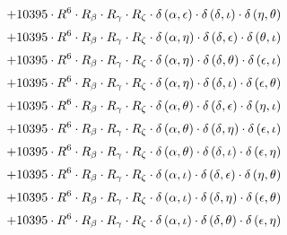 \begin{subequations}
\begin{gather}
 \\[0.2em] \notag 		 + 10395 \cdot R^{6} \cdot R_{\beta{}} \cdot R_{\gamma{}} \cdot R_{\zeta{}} \cdot \delta{}\left(\alpha{}, \epsilon{}\right) \cdot \delta{}\left(\delta{}, \iota{}\right) \cdot \delta{}\left(\eta{}, \theta{}\right) 
 \\[0.2em] \notag 		 + 10395 \cdot R^{6} \cdot R_{\beta{}} \cdot R_{\gamma{}} \cdot R_{\zeta{}} \cdot \delta{}\left(\alpha{}, \eta{}\right) \cdot \delta{}\left(\delta{}, \epsilon{}\right) \cdot \delta{}\left(\theta{}, \iota{}\right) 
 \\[0.2em] \notag 		 + 10395 \cdot R^{6} \cdot R_{\beta{}} \cdot R_{\gamma{}} \cdot R_{\zeta{}} \cdot \delta{}\left(\alpha{}, \eta{}\right) \cdot \delta{}\left(\delta{}, \theta{}\right) \cdot \delta{}\left(\epsilon{}, \iota{}\right) 
 \\[0.2em] \notag 		 + 10395 \cdot R^{6} \cdot R_{\beta{}} \cdot R_{\gamma{}} \cdot R_{\zeta{}} \cdot \delta{}\left(\alpha{}, \eta{}\right) \cdot \delta{}\left(\delta{}, \iota{}\right) \cdot \delta{}\left(\epsilon{}, \theta{}\right) 
 \\[0.2em] \notag 		 + 10395 \cdot R^{6} \cdot R_{\beta{}} \cdot R_{\gamma{}} \cdot R_{\zeta{}} \cdot \delta{}\left(\alpha{}, \theta{}\right) \cdot \delta{}\left(\delta{}, \epsilon{}\right) \cdot \delta{}\left(\eta{}, \iota{}\right) 
 \\[0.2em] \notag 		 + 10395 \cdot R^{6} \cdot R_{\beta{}} \cdot R_{\gamma{}} \cdot R_{\zeta{}} \cdot \delta{}\left(\alpha{}, \theta{}\right) \cdot \delta{}\left(\delta{}, \eta{}\right) \cdot \delta{}\left(\epsilon{}, \iota{}\right) 
 \\[0.2em] \notag 		 + 10395 \cdot R^{6} \cdot R_{\beta{}} \cdot R_{\gamma{}} \cdot R_{\zeta{}} \cdot \delta{}\left(\alpha{}, \theta{}\right) \cdot \delta{}\left(\delta{}, \iota{}\right) \cdot \delta{}\left(\epsilon{}, \eta{}\right) 
 \\[0.2em] \notag 		 + 10395 \cdot R^{6} \cdot R_{\beta{}} \cdot R_{\gamma{}} \cdot R_{\zeta{}} \cdot \delta{}\left(\alpha{}, \iota{}\right) \cdot \delta{}\left(\delta{}, \epsilon{}\right) \cdot \delta{}\left(\eta{}, \theta{}\right) 
 \\[0.2em] \notag 		 + 10395 \cdot R^{6} \cdot R_{\beta{}} \cdot R_{\gamma{}} \cdot R_{\zeta{}} \cdot \delta{}\left(\alpha{}, \iota{}\right) \cdot \delta{}\left(\delta{}, \eta{}\right) \cdot \delta{}\left(\epsilon{}, \theta{}\right) 
 \\[0.2em] \notag 		 + 10395 \cdot R^{6} \cdot R_{\beta{}} \cdot R_{\gamma{}} \cdot R_{\zeta{}} \cdot \delta{}\left(\alpha{}, \iota{}\right) \cdot \delta{}\left(\delta{}, \theta{}\right) \cdot \delta{}\left(\epsilon{}, \eta{}\right) 

\end{gather}
\end{subequations}
